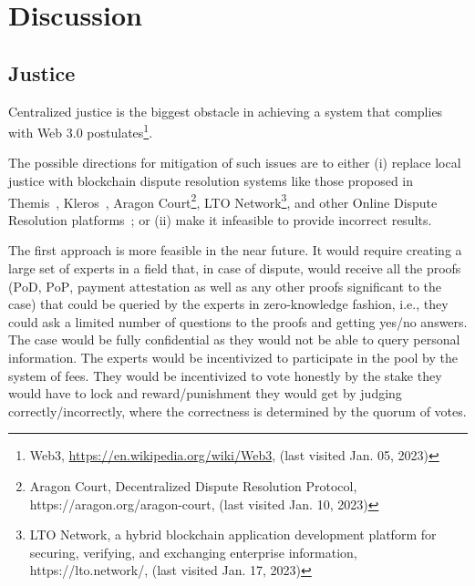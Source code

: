 

\section{Discussion}
\label{sec:discussion}

\subsection{Justice}\label{sec:decentralised-justice}

Centralized justice is the biggest obstacle in achieving a system that complies with Web 3.0 postulates\footnote{Web3, \url{https://en.wikipedia.org/wiki/Web3}, (last visited Jan. 05, 2023)}.

The possible directions for mitigation of such issues are to either (i) replace local justice with blockchain dispute resolution systems like those proposed in Themis~\cite{mengThemisDecentralizedEscrow2019}, Kleros~\cite{bergollaKlerosSociolegalCase2022,gudkovCrowdArbitrationBlockchain2020}, Aragon Court\footnote{Aragon Court, Decentralized Dispute Resolution Protocol, https://aragon.org/aragon-court, (last visited Jan. 10, 2023)}, LTO Network\footnote{LTO Network, a hybrid blockchain application development platform for securing, verifying, and exchanging enterprise information, https://lto.network/, (last visited Jan. 17, 2023)}, and other Online Dispute Resolution platforms~\cite{allenGovernanceBlockchainDispute2019}; or (ii) make it infeasible to provide incorrect results.

The first approach is more feasible in the near future. It would require creating a large set of experts in a field that, in case of dispute, would receive all the proofs ($\mathrm{PoD}$, $\mathrm{PoP}$, payment $\mathrm{attestation}$ as well as any other proofs significant to the case) that could be queried by the experts in zero-knowledge fashion, i.e., they could ask a limited number of questions to the proofs and getting yes/no answers. The case would be fully confidential as they would not be able to query personal information. The experts would be incentivized to participate in the pool by the system of fees. They would be incentivized to vote honestly by the stake they would have to lock and reward/punishment they would get by judging correctly/incorrectly, where the correctness is determined by the quorum of votes.

